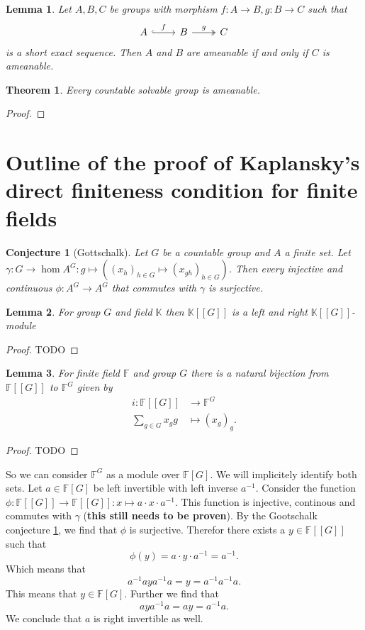 \documentclass[a4paper]{report}
\newcommand{\F}{\mathbb{F}}
\newtheorem{theorem}{Theorem}
\newtheorem{lemma}{Lemma}
\newtheorem{conjecture}{Conjecture}
\begin{document}
    \begin{lemma}
        \label{lem:ameanable_short_exact_sequence}
        Let $A, B, C$ be groups with morphism $f:A\to B, g:B\to C$ such that
        \[\begin{tikzcd}
            A \arrow[r, "f", hook] & B \arrow[r, "g", two heads] & C
        \end{tikzcd}\] is a short exact sequence. Then $A$ and $B$ are ameanable if and only if $C$ is ameanable.
    \end{lemma}
    \begin{theorem}
        Every countable solvable group is ameanable. 
    \end{theorem}
    \begin{proof}
        
    \end{proof}
	\section{Outline of the proof of Kaplansky's direct finiteness condition for finite fields}
	\begin{conjecture}[Gottschalk] \label{conj:gottschalk}
		Let $G$ be a countable group and $A$ a finite set. 
		Let $\gamma: G\to \hom{A^{G}}:g \mapsto \left( (x_{h})_{h \in G} \mapsto \left( x_{gh} \right)_{h \in G}  \right)$.
		Then every injective and continuous $\phi: A^{G}\to A^{G}$ that commutes with $\gamma$ is surjective.
	\end{conjecture}
	\begin{lemma}
		For group $G$ and field $\mathbb K$ then $\mathbb{K}[[G]]$ is a left and right $\mathbb{K}[[G]]$-module
	\end{lemma}
	\begin{proof}
		TODO
	\end{proof}
	\begin{lemma}
		For finite field $\F$ and group $G$ there is a natural bijection from $\F[[G]]$ to $\F^{G}$ given by \begin{align*}
			i: \F[[G]] &\longrightarrow \F^{G} \\
			\sum_{g \in G}^{ } x_{g}g &\longmapsto (x_g)_g
		.\end{align*}
	\end{lemma}
	\begin{proof}
		TODO
	\end{proof}
	So we can consider $\F^G$ as a module over $\F[G]$. We will implicitely identify both sets.
	Let $a\in \F[G]$ be left invertible with left inverse $a^{-1}$. Consider the function $\phi: \F[[G]] \to \F[[G]]: x \mapsto a\cdot x \cdot a^{-1}$. This function is injective, continous and commutes with $\gamma$ (\textbf{this still needs to be proven}).
	By the Gootschalk conjecture \ref{conj:gottschalk}, we find that $\phi$ is surjective. Therefor there exists a $y \in \F[[G]]$ such that \[
		\phi(y) = a \cdot y \cdot a ^{-1} = a^{-1}
	.\] 
	Which means that  \[
	a^{-1} a y a^{-1} a = y =a^{-1} a^{-1} a
	.\] 
	This means that $y \in \F[G]$. Further we find that \[
	a y a^{-1} a = a y  = a^{-1} a
	.\] We conclude that $a$ is right invertible as well. 
	\printbibliography
\end{document}
